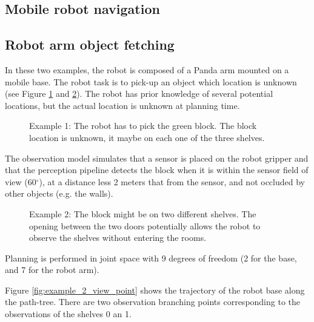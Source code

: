 \documentclass[letterpaper, 10 pt, conference]{ieeeconf}  %
\begin{document}
\subsection{Mobile robot navigation} \label{experiment:navigation}

\subsection{Robot arm object fetching} \label{experiment:mobile_manipulation}
In these two examples, the robot is composed of a Panda arm mounted on a mobile base. The robot task is to pick-up an object which location is unknown (see Figure \ref{fig:arm_example_1} and \ref{fig:arm_example_2}). The robot has prior knowledge of several potential locations, but the actual location is unknown at planning time. 


\begin{figure}[!htb]
 \caption{Example 1: The robot has to pick the green block. The block location is unknown, it maybe on each one of the three shelves.}
 \label{fig:arm_example_1}
\end{figure}

The observation model simulates that a sensor is placed on the robot gripper and that the perception pipeline detects the block when it is within the sensor field of view (60$^{\circ}$), at a distance less 2 meters that from the sensor, and not occluded by other objects (e.g. the walls).

\begin{figure}[!htb]
 \caption{Example 2: The block might be on two different shelves. The opening between the two doors potentially allows the robot to observe the shelves without entering the rooms.}
 \label{fig:arm_example_2}
\end{figure}

Planning is performed in joint space with 9 degrees of freedom (2 for the base, and 7 for the robot arm).

Figure \ref{fig:example_2_view_point} shows the trajectory of the robot base along the path-tree. There are two observation branching points corresponding to the observations of the shelves 0 an 1.
\end{document}
